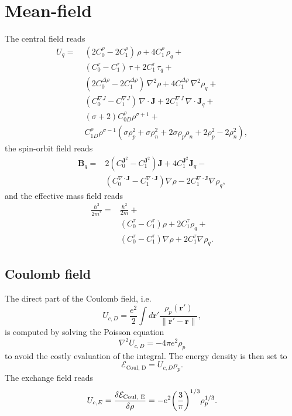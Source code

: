 \documentclass[%
 reprint, linenumbers,
 amsmath,amssymb,
 aps, physrev
]{revtex4-2}
\begin{document}
\section{Mean-field}
The central field reads
\begin{align}
U_q =\;&
(2 C_{0}^{\rho} - 2 C_{1}^{\rho})\, \rho
+ 4 C_{1}^{\rho}\, \rho_q + \nonumber\\
& (C_{0}^{\tau} - C_{1}^{\tau})\, \tau
+ 2 C_{1}^{\tau}\, \tau_q + \nonumber\\
& (2 C_{0}^{\Delta\rho} - 2 C_{1}^{\Delta\rho})\, \nabla^2 \rho
+ 4 C_{1}^{\Delta\rho}\, \nabla^2 \rho_q + \nonumber\\
& (C_{0}^{\nabla J} - C_{1}^{\nabla J})\, \nabla \cdot \mathbf{J}
+ 2 C_{1}^{\nabla J}\, \nabla \cdot \mathbf{J}_q + \nonumber\\
& (\sigma+2)C_{0D}^\rho \rho^{\sigma+1}+\nonumber\\&C_{1D}^\rho\rho^{\sigma-1}(\sigma\rho_p^2+\sigma\rho_n^2+2\sigma\rho_p\rho_n + 2\rho_p^2-2\rho_n^2)\nonumber,
\end{align}
the spin-orbit field reads
\begin{align}
\bm B_q =& 2(C_0^{\bm J^2} - C_1^{\bm J^2})\bm J + 4C_1^{\bm J^2}\bm J_q - \nonumber\\
&(C_0^{\nabla \cdot \bm J} - C_1^{\nabla \cdot \bm J})\nabla \rho - 2C_1^{\nabla \cdot \bm J}\nabla \rho_q \nonumber,
\end{align}
and the effective mass field reads
\begin{align}
  \frac{\hbar^2}{2m^*}=&\frac{\hbar ^2}{2m}+\\
  &(C_0^\tau-C_1^\tau)\rho + 2C_1^\tau\rho_q + \nonumber\\
  &(C_0^\tau - C_1^\tau)\nabla \rho + 2C_1^\tau\nabla \rho_q. \nonumber
\end{align}
\subsection{Coulomb field}
The direct part of the Coulomb field, i.e.
\begin{equation}
  U_{c,D} = \frac{e^2}{2}\int d \bm r' \frac{\rho_p(\bm r')}{\|\bm r'-\bm r\|},
\end{equation}
is computed by solving the Poisson equation
\begin{equation}
  \nabla^2 U_{c, D} = -4\pi e^2\rho_p
\end{equation}
to avoid the costly evaluation of the integral. The energy density is then set to
\begin{equation}
  \mathcal E_\text{Coul, D} = U_{c,D}\rho_p.
\end{equation}
The exchange field reads
\begin{equation}
  U_{c, E} = \fdv{\mathcal E_\text{Coul, E}}{\rho} = -e^2\bigg(\frac 3 \pi \bigg)^{1/3}\rho_p^{1/3}.
\end{equation}
\end{document}

